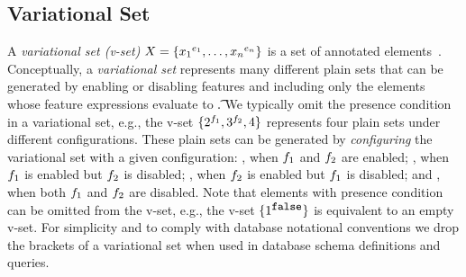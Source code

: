 \subsection{Variational Set}
\label{sec:vlist-vset}

A \emph{variational set (v-set)} $\vset = \setDef {\annot [\dimMeta_1] {\elem_1},\ldots, \annot [\dimMeta_n] {\elem_n}}$ 
is a set of annotated elements~\cite{EWC13fosd,Walk14onward,ATW17dbpl}.
%
Conceptually, a \emph{variational set} represents many different plain sets
that can be generated by enabling or disabling features
and including only the elements whose feature expressions evaluate to \t.
We typically omit the presence condition  in a variational set,
e.g., the v-set 
$\setDef {\annot [\A] 2, \annot [\B] 3, 4}$
represents four plain sets under different configurations. These plain
sets can be generated by \emph{configuring} the variational set with a
given configuration: 
, when $\A$ and $\B$
are enabled; , when $\A$ is enabled but $\B$ is disabled;
, when $\B$ is enabled but $\A$ is disabled;
and , when both $\A$ and $\B$ are disabled.
%
Note that elements with presence condition  can be omitted
from the v-set, e.g., the v-set \ensuremath{\setDef {\annot [\f] {1}}} is 
equivalent to an empty v-set.
For simplicity and to comply with database notational conventions
we drop the brackets of a variational set when used in database
schema definitions and queries.

